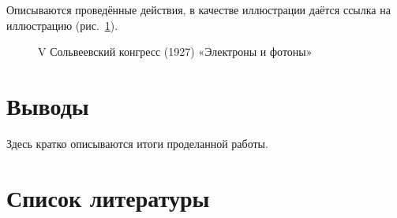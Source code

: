 \documentclass[
  english,
  russian,
  12pt,
  a4paper,
  DIV=11,
  numbers=noendperiod]{scrreprt}
\begin{document}
Описываются проведённые действия, в качестве иллюстрации даётся ссылка
на иллюстрацию (рис.~\ref{fig-001}).

\begin{figure}


\caption{\label{fig-001}V Сольвеевский конгресс (1927) «Электроны и
фотоны»}

\end{figure}%

\chapter{Выводы}\label{ux432ux44bux432ux43eux434ux44b}

Здесь кратко описываются итоги проделанной работы.

\chapter*{Список
литературы}\label{ux441ux43fux438ux441ux43eux43a-ux43bux438ux442ux435ux440ux430ux442ux443ux440ux44b}

\printbibliography[heading=none]
\end{document}
